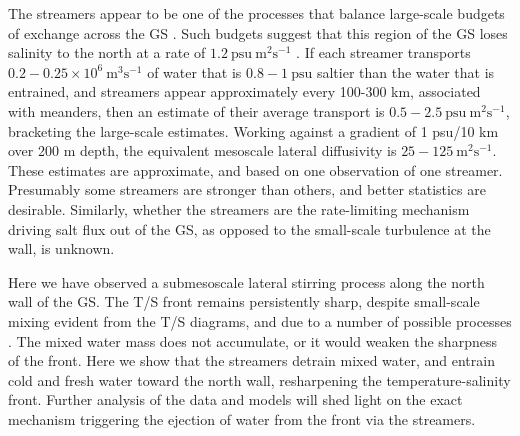 \documentclass[draft,grl]{agutex2015}
\begin{document}
\begin{article}
The streamers appear to be one of the processes that balance large-scale budgets of exchange across the GS \citep{joyceetal13,boweretal85}. Such budgets suggest that this region of the GS loses salinity to the north at a rate of $1.2\ \mathrm{psu\  m^2 s^{-1}}$  \citep{joyceetal13}.  If each streamer transports $0.2-0.25 \times 10^6\ \mathrm{m^3 s^{-1}}$ of water that is $0.8-1\ \mathrm{psu}$ saltier than the water that is entrained, and streamers appear approximately every 100-300 km, associated with meanders, then an estimate of their average transport is $0.5- 2.5\ \mathrm{psu\ m^2s^{-1}}$, bracketing the large-scale estimates.  Working against a gradient of 1 psu/10 km over 200 m depth, the equivalent mesoscale lateral diffusivity is $25-125\ \mathrm{m^2s^{-1}}$.  These estimates are approximate, and based on one observation of one streamer.  Presumably some streamers are stronger than others, and better statistics are desirable. Similarly, whether the streamers are the rate-limiting mechanism driving salt flux out of the GS, as opposed to the small-scale turbulence at the wall, is unknown.  

Here we have observed a submesoscale lateral stirring process along the north wall of the GS.  The T/S front remains persistently sharp, despite small-scale mixing evident from the T/S diagrams, and due to a number of possible processes  \citep{thomasshakespeare15,whittthomas13}. The mixed water mass does not accumulate, or it would weaken the sharpness of the front. Here we show that the streamers detrain mixed water, and entrain cold and fresh water toward the north wall, resharpening the temperature-salinity front. Further analysis of the data and models will shed light on the exact mechanism triggering the ejection of water from the front via the streamers.


\end{article}
\end{document}
